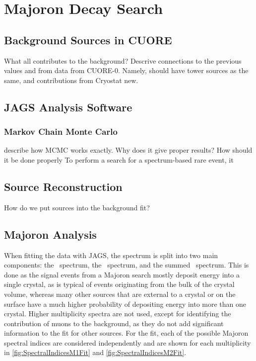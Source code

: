 \chapter{Majoron Decay Search}

\section{Background Sources in CUORE}
What all contributes to the background? Descrive connections to the previous values and from data from CUORE-0. Namely, should have tower sources as the same, and contributions from Cryostat new.
\section{JAGS Analysis Software}
\subsection{Markov Chain Monte Carlo}
\label{ssec:MCMC}

describe how MCMC works exactly. Why does it give proper results? How should it be done properly
To perform a search for a spectrum-based rare event, it 
\section{Source Reconstruction}
How do we put sources into the background fit?
\section{Majoron Analysis}
When fitting the data with JAGS, the spectrum is split into two main components: the \Mone~spectrum, the \Mtwo~spectrum, and the summed \Msum~spectrum. This is done as the signal events from a Majoron search mostly deposit energy into a single crystal, as is typical of events originating from the bulk of the crystal volume, whereas many other sources that are external to a crystal or on the surface have a much higher probability of depositing energy into more than one crystal. Higher multiplicity spectra are not used, except for identifying the contribution of muons to the background, as they do not add significant information to the fit for other sources. For the fit, each of the possible Majoron spectral indices are considered independently and are shown for each multiplicity in \autoref{fig:SpectralIndicesM1Fit} and \autoref{fig:SpectralIndicesM2Fit}.


